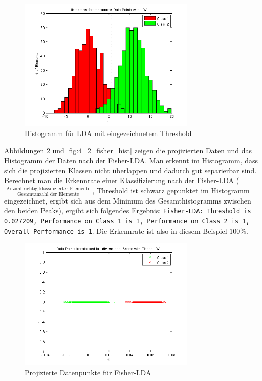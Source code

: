 \begin{figure}[hp!]
\begin{center}
 \includegraphics[width=0.75\textwidth]{./figures/4_2_lda_hist}
 \caption{Histogramm für LDA mit eingezeichnetem Threshold}
\label{fig:4_2_lda_hist}
\end{center}
\end{figure}


Abbildungen \ref{fig:4_2_fisher_1d} und \ref{fig:4_2_fisher_hist} zeigen die projizierten Daten und das Histogramm der Daten nach der Fisher-LDA. Man erkennt im Histogramm, dass sich die projizierten Klassen nicht überlappen und dadurch gut separierbar sind. Berechnet man die Erkennrate einer Klassifizierung nach der Fisher-LDA ($\frac{\textrm{ Anzahl richtig klassifizierter Elemente }}{\textrm{ Gesamtanzahl der Elemente }}$, Threshold ist schwarz gepunktet im Histogramm eingezeichnet, ergibt sich aus dem Minimum des Gesamthistogramms zwischen den beiden Peaks), ergibt sich folgendes Ergebnis: \texttt{Fisher-LDA: Threshold is 0.027209, Performance on Class 1 is 1, Performance on Class 2 is 1, Overall Performance is 1}. Die Erkennrate ist also in diesem Beispiel $100\%$.

\begin{figure}[hp!]
\begin{center}
 \includegraphics[width=0.75\textwidth]{./figures/4_2_fisher_1d}
 \caption{Projizierte Datenpunkte für Fisher-LDA}
\label{fig:4_2_fisher_1d}
\end{center}
\end{figure}

